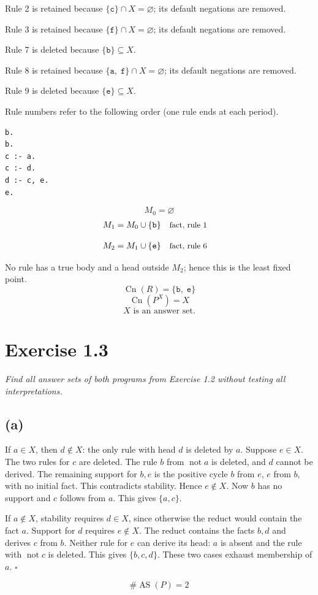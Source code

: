 \documentclass[a4paper,11pt]{article}
\newif\ifexplain
\newcommand{\explain}[1]{\ifexplain\begin{erklbox}#1\end{erklbox}\fi}
\newcommand{\why}[1]{\text{\small #1}}
\newcommand{\angabe}[1]{\textit{#1}\par}
\newcommand{\aufgabe}[1]{\section*{Exercise #1}}
\newcommand{\teil}[1]{\subsection*{(#1)}}
\newcommand{\at}[1]{\texttt{#1}}
\begin{document}
Rule 2 is retained because $\{\at{c}\}\cap X=\varnothing$; its default negations are removed.

Rule 3 is retained because $\{\at{f}\}\cap X=\varnothing$; its default negations are removed.

Rule 7 is deleted because $\{\at{b}\}\subseteq X$.

Rule 8 is retained because $\{\at{a},\;\at{f}\}\cap X=\varnothing$; its default negations are removed.

Rule 9 is deleted because $\{\at{e}\}\subseteq X$.

Rule numbers refer to the following order (one rule ends at each period).
\begin{small}
\begin{verbatim}
b.
b.
c :- a.
c :- d.
d :- c, e.
e.
\end{verbatim}
\end{small}
\explain{Beim Redukt bleibt die Kandidatenmenge fest. Wir entscheiden zuerst, welche Regeln wegfallen. Erst danach berechnen wir aus den verbleibenden positiven Regeln die kleinste abgeschlossene Menge. Ein Modell allein reicht nicht: Diese Menge muss genau der Kandidat sein.}
\[
M_0=\varnothing
\]
\begin{align*}
M_{1} &= M_{0}\cup \{\at{b}\} && \why{fact, rule 1}
\end{align*}
\explain{Diese Regel hat keinen Körper. Ihr Kopf $\at{b}$ ist damit ein Fakt und muss in die Menge.}
\begin{align*}
M_{2} &= M_{1}\cup \{\at{e}\} && \why{fact, rule 6}
\end{align*}
\explain{Diese Regel hat keinen Körper. Ihr Kopf $\at{e}$ ist damit ein Fakt und muss in die Menge.}
No rule has a true body and a head outside $M_{2}$; hence this is the least fixed point.
\[
\operatorname{Cn}(R)=\{\at{b},\;\at{e}\}
\]
\[
\operatorname{Cn}(P^X)=X
\]
\[
\boxed{X\text{ is an answer set.}}
\]
\aufgabe{1.3}
\angabe{Find all answer sets of both programs from Exercise 1.2 without testing all interpretations.}
\teil{a}
If $a\in X$, then $d\notin X$: the only rule with head $d$ is deleted by $a$. Suppose $e\in X$. The two rules for $c$ are deleted. The rule $b$ from $\mathop{not}a$ is deleted, and $d$ cannot be derived. The remaining support for $b,e$ is the positive cycle $b$ from $e$, $e$ from $b$, with no initial fact. This contradicts stability. Hence $e\notin X$. Now $b$ has no support and $c$ follows from $a$. This gives $\{a,c\}$.

If $a\notin X$, stability requires $d\in X$, since otherwise the reduct would contain the fact $a$. Support for $d$ requires $e\notin X$. The reduct contains the facts $b,d$ and derives $c$ from $b$. Neither rule for $e$ can derive its head: $a$ is absent and the rule with $\mathop{not}c$ is deleted. This gives $\{b,c,d\}$. These two cases exhaust membership of $a$. $\square$
\explain{Wir teilen nur nach Atomen auf, die eine echte Entscheidung durch Default-Negation auslösen. Danach erzwingen Fakten und Regeln den Rest. Ein positiver Kreis begründet sich nicht selbst: Ohne Startregel bleibt er beim Aufbau der kleinsten Menge leer.}
\[
\boxed{\#\operatorname{AS}(P)=2}
\]
\end{document}
